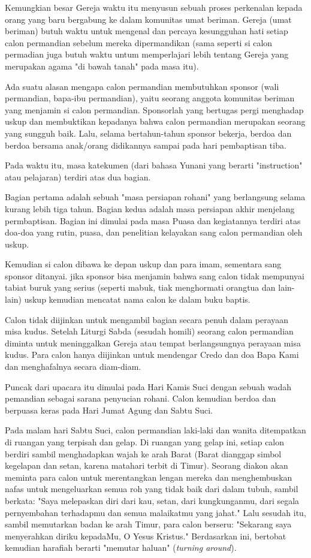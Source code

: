     Kemungkian besar Gereja waktu itu menyusun sebuah proses perkenalan kepada orang yang baru bergabung ke dalam komunitas umat beriman. Gereja (umat beriman) butuh waktu untuk mengenal dan percaya kesungguhan hati setiap calon permandian sebelum mereka dipermandikan (sama seperti si calon permadian juga butuh waktu untum memperlajari lebih tentang Gereja yang merupakan agama "di bawah tanah" pada masa itu).

    Ada suatu alasan mengapa calon permandian membutuhkan sponsor (wali permandian, bapa-ibu permandian), yaitu seorang anggota komunitas beriman yang menjamin si calon permandian. Sponsorlah yang bertugas pergi menghadap uskup dan membuktikan kepadanya bahwa calon permandian merupakan seorang yang sungguh baik. Lalu, selama bertahun-tahun sponsor bekerja, berdoa dan berdoa bersama anak/orang didikannya sampai pada hari pembaptisan tiba.

    Pada waktu itu, masa katekumen (dari bahasa Yunani yang berarti "instruction" atau pelajaran) terdiri atas dua bagian.

    Bagian pertama adalah sebuah "masa persiapan rohani" yang berlangsung selama kurang lebih tiga tahun. Bagian kedua adalah masa persiapan akhir menjelang permbaptisan. Bagian ini dimulai pada masa Puasa dan kegiatannya terdiri atas doa-doa yang rutin, puasa, dan penelitian kelayakan sang calon permandian oleh uskup.

    Kemudian si calon dibawa ke depan uskup dan para imam, sementara sang sponsor ditanyai. jika sponsor bisa menjamin bahwa sang calon tidak mempunyai tabiat buruk yang serius (seperti mabuk, tiak menghormati orangtua dan lain-lain) uskup kemudian mencatat nama calon ke dalam buku baptis.

    Calon tidak diijinkan untuk mengambil bagian secara penuh dalam perayaan misa kudus. Setelah Liturgi Sabda (sesudah homili) seorang calon permandian diminta untuk meninggalkan Gereja atau tempat berlangsungnya perayaan misa kudus. Para calon hanya diijinkan untuk mendengar Credo dan doa Bapa Kami dan menghafalnya secara diam-diam.

    Puncak dari upacara itu dimulai pada Hari Kamis Suci dengan sebuah wadah pemandian sebagai sarana penyucian rohani. Calon kemudian berdoa dan berpuasa keras pada Hari Jumat Agung dan Sabtu Suci.

    Pada malam hari Sabtu Suci, calon permandian laki-laki dan wanita ditempatkan di ruangan yang terpisah dan gelap. Di ruangan yang gelap ini, setiap calon berdiri sambil menghadapkan wajah ke arah Barat (Barat dianggap simbol kegelapan dan setan, karena matahari terbit di Timur). Seorang diakon akan meminta para calon untuk merentangkan lengan mereka dan menghembuskan nafas untuk mengeluarkan semua roh yang tidak baik dari dalam tubuh, sambil berkata: "Saya melepaskan diri dari kau, setan, dari kungkunganmu, dari segala pernyembahan terhadapmu dan semua malaikatmu yang jahat." Lalu sesudah itu, sambil memutarkan badan ke arah Timur, para calon berseru: "Sekarang saya menyerahkan diriku kepadaMu, O Yesus Kristus." Berdasarkan ini, bertobat kemudian harafiah berarti "memutar haluan" (\textit{turning around}).

